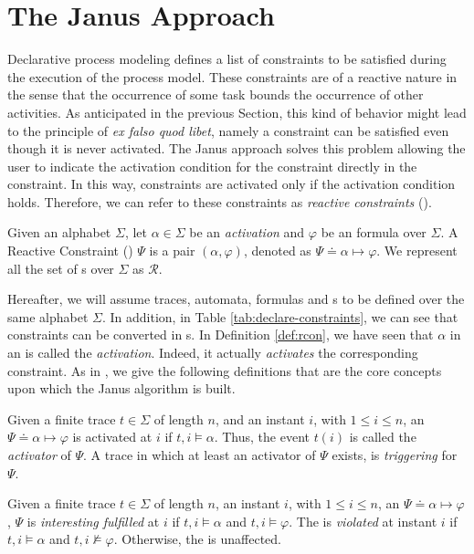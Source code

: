 \section{The Janus Approach}\label{sec:janus}
Declarative process modeling defines a list of \declare constraints to be satisfied during the execution of the process model. These constraints are of a reactive nature in the sense that the occurrence of some task bounds the occurrence of other activities. As anticipated in the previous Section, this kind of behavior might lead to the principle of \textit{ex falso quod libet}, namely a constraint can be satisfied even though it is never activated. The Janus approach \citep{cecconi2018interestingness} solves this problem allowing the user to indicate the activation condition for the constraint directly in the constraint. In this way, constraints are activated only if the activation condition holds. Therefore, we can refer to these constraints as \textit{reactive constraints} (\rcon).
\begin{definition}\citep{cecconi2018interestingness}\label{def:rcon}
Given an alphabet $\Sigma$, let $\alpha \in \Sigma$ be an \emph{activation} and $\varphi$ be an \LTLp formula over $\Sigma$. A Reactive Constraint (\rcon) $\Psi$ is a pair $(\alpha, \varphi)$, denoted as $\Psi \doteq \alpha  \mapsto \varphi$. We represent all the set of \rcon s over $\Sigma$ as $\mathcal{R}$.
\end{definition}
Hereafter, we will assume traces, automata, \LTLp formulas and \rcon s to be defined over the same alphabet $\Sigma$. In addition, in Table \ref{tab:declare-constraints}, we can see that \declare constraints can be converted in \rcon s. In Definition \ref{def:rcon}, we have seen that $\alpha$ in an \rcon\xspace is called the \emph{activation}. Indeed, it actually \emph{activates} the corresponding constraint. As in \citep{cecconi2018interestingness}, we give the following definitions that are the core concepts upon which the Janus algorithm is built.
\begin{definition}\citep{cecconi2018interestingness}\label{def:activator}
Given a finite trace $t \in \Sigma$ of length $n$, and an instant $i$, with $1 \le i \le n$, an \rcon\xspace $\Psi \doteq \alpha  \mapsto \varphi$ is activated at $i$ if $t,i \models \alpha$. Thus, the event $t(i)$ is called the \emph{activator} of $\Psi$. A trace in which at least an activator of $\Psi$ exists, is \emph{triggering} for $\Psi$.
\end{definition}

\begin{definition}\citep{cecconi2018interestingness}\label{def:interesting-fulfilment}
Given a finite trace $t \in \Sigma$ of length $n$, an instant $i$, with $1 \le i \le n$, an \rcon\xspace $\Psi \doteq \alpha  \mapsto \varphi$, $\Psi$ is \emph{interesting fulfilled} at $i$ if $t,i \models \alpha$ and $t,i \models \varphi$. The \rcon\xspace is \emph{violated} at instant $i$ if $t,i \models \alpha$ and $t,i \not\models \varphi$. Otherwise, the \rcon\xspace is unaffected.
\end{definition}

